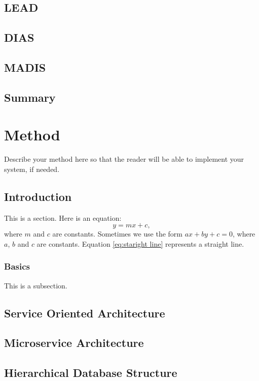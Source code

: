 \documentclass[a4paper,oneside,12pt]{report}
\begin{document}
\section{LEAD}

\section{DIAS}

\section{MADIS}

\section{Summary}

\chapter{Method}
\label{ch:method}

Describe your method here so that the reader will be able to implement your system, if needed. 
\section{Introduction}
This is a section.
\label{se:method introduction}
Here is an equation:
\begin{equation}\label{eq:staright line}
    y = mx + c,
\end{equation}
where $m$ and $c$ are constants. Sometimes we use the form $ax + by + c = 0$, where $a$, $b$ and $c$ are constants. Equation \ref{eq:staright line} represents a straight line.

\subsection{Basics}
This is a subsection.

\section{Service Oriented Architecture}

\section{Microservice Architecture}

\section{Hierarchical Database Structure}
\end{document}

